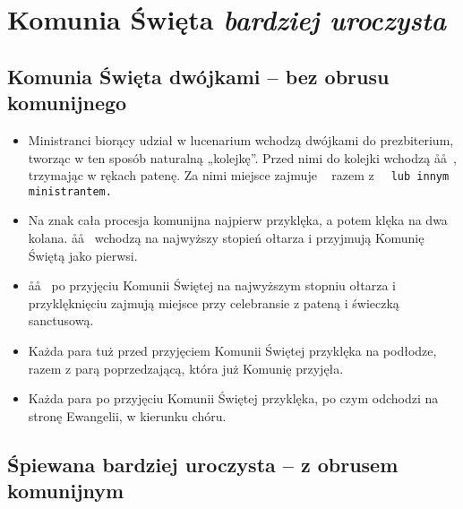 \section{Komunia Święta \textit{bardziej uroczysta}}

\subsection{Komunia Święta dwójkami – bez obrusu komunijnego}

\begin{itemize}
	\item Ministranci biorący udział w lucenarium wchodzą dwójkami do
	      prezbiterium, tworząc w ten sposób naturalną „kolejkę”. Przed nimi do
	      kolejki wchodzą \aa\aa~, trzymając w rękach patenę. Za nimi miejsce
	      zajmuje \cc~ razem z \tt~ lub innym ministrantem.
	\item Na znak \cc cała procesja komunijna najpierw przyklęka, a potem klęka
	      na dwa kolana. \aa\aa~ wchodzą na najwyższy stopień ołtarza i
	      przyjmują Komunię Świętą jako pierwsi.
	\item \aa\aa~ po przyjęciu Komunii Świętej na najwyższym stopniu ołtarza i
	      przyklęknięciu zajmują miejsce przy celebransie z pateną i świeczką
	      sanctusową.
	\item Każda para tuż przed przyjęciem Komunii Świętej przyklęka na podłodze,
	      razem z parą poprzedzającą, która już Komunię przyjęła.
	\item Każda para po przyjęciu Komunii Świętej przyklęka, po czym odchodzi na
	      stronę Ewangelii, w kierunku chóru.
\end{itemize}

\subsection{Śpiewana bardziej uroczysta – z obrusem komunijnym}

